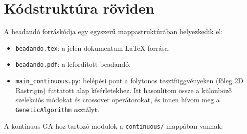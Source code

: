 \documentclass[a4paper,12pt]{article}
\begin{document}
\section{Kódstruktúra röviden}

A beadandó forráskódja egy egyszerű mappastruktúrában helyezkedik el:

\begin{itemize}
  \item \texttt{beadando.tex}: a jelen dokumentum \LaTeX{} forrása.
  \item \texttt{beadando.pdf}: a lefordított beadandó.
  \item \texttt{main\_continuous.py}: belépési pont a folytonos tesztfüggvényeken
        (főleg 2D Rastrigin) futtatott alap kísérletekhez. Itt hasonlítom össze
        a különböző szelekciós módokat és crossover operátorokat, és innen
        hívom meg a \texttt{GeneticAlgorithm} osztályt.
\end{itemize}

A kontinuus GA-hoz tartozó modulok a \texttt{continuous/} mappában vannak:
\end{document}
